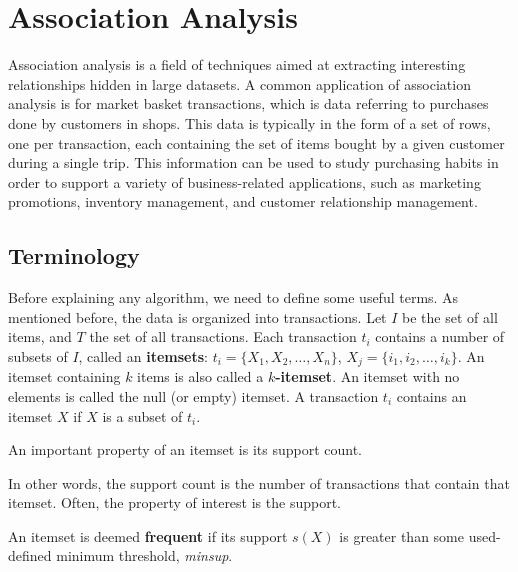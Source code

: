 \chapter{Association Analysis}

Association analysis is a field of techniques aimed at extracting interesting relationships hidden in large datasets. A common application of association analysis is for market basket transactions, which is data referring to purchases done by customers in shops. This data is typically in the form of a set of rows, one per transaction, each containing the set of items bought by a given customer during a single trip. This information can be used to study purchasing habits in order to support a variety of business-related applications, such as marketing promotions, inventory management, and customer relationship management.

\section{Terminology}

Before explaining any algorithm, we need to define some useful terms. As mentioned before, the data is organized into transactions. Let $I$ be the set of all items, and $T$ the set of all transactions. Each transaction $t_i$ contains a number of subsets of $I$, called an \textbf{itemsets}: $t_i = \{ X_1, X_2, \dots, X_n \}$, $X_j = \{ i_1, i_2, \dots, i_k \}$. An itemset containing $k$ items is also called a \textbf{$k$-itemset}. An itemset with no elements is called the null (or empty) itemset. A transaction $t_i$ contains an itemset $X$ if $X$ is a subset of $t_i$.

An important property of an itemset is its support count.

In other words, the support count is the number of transactions that contain that itemset. Often, the property of interest is the support.

An itemset is deemed \textbf{frequent} if its support $s(X)$ is greater than some used-defined minimum threshold, \textit{minsup}.

